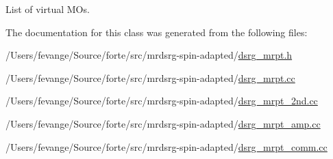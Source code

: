 List of virtual M\+Os. 



The documentation for this class was generated from the following files\+:\begin{DoxyCompactItemize}
\item 
/\+Users/fevange/\+Source/forte/src/mrdsrg-\/spin-\/adapted/\mbox{\hyperlink{dsrg__mrpt_8h}{dsrg\+\_\+mrpt.\+h}}\item 
/\+Users/fevange/\+Source/forte/src/mrdsrg-\/spin-\/adapted/\mbox{\hyperlink{dsrg__mrpt_8cc}{dsrg\+\_\+mrpt.\+cc}}\item 
/\+Users/fevange/\+Source/forte/src/mrdsrg-\/spin-\/adapted/\mbox{\hyperlink{dsrg__mrpt__2nd_8cc}{dsrg\+\_\+mrpt\+\_\+2nd.\+cc}}\item 
/\+Users/fevange/\+Source/forte/src/mrdsrg-\/spin-\/adapted/\mbox{\hyperlink{dsrg__mrpt__amp_8cc}{dsrg\+\_\+mrpt\+\_\+amp.\+cc}}\item 
/\+Users/fevange/\+Source/forte/src/mrdsrg-\/spin-\/adapted/\mbox{\hyperlink{dsrg__mrpt__comm_8cc}{dsrg\+\_\+mrpt\+\_\+comm.\+cc}}\end{DoxyCompactItemize}
